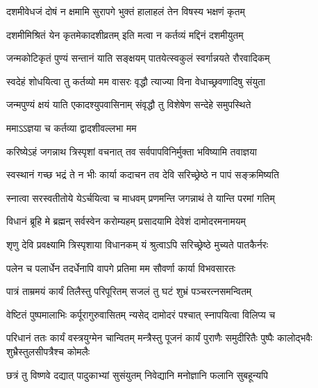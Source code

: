\twolineshloka
{दशमीवेधजं दोषं न क्षमामि सुरापगे}
{भुक्तं हालाहलं तेन विषस्य भक्षणं कृतम्}%

\twolineshloka
{दशमीमिश्रितं येन कृतमेकादशीव्रतम्}
{इति मत्वा न कर्तव्यं मद्दिनं दशमीयुतम्}%

\twolineshloka
{जन्मकोटिकृतं पुण्यं सन्तानं याति सङ्क्षयम्}
{पातयेत्स्वकुलं स्वर्गान्नयते रौरवादिकम्}%

\twolineshloka
{स्वदेहं शोधयित्वा तु कर्तव्यो मम वासरः}
{वृद्धौ त्याज्या विना वेधाच्छ्रवणादिषु संयुता}%

\twolineshloka
{जन्मपुण्यं क्षयं याति एकादश्युपवासिनाम्}
{संवृद्धौ तु विशेषेण सन्देहे समुपस्थिते}%

\onelineshloka
{ममाऽऽज्ञया च कर्तव्या द्वादशीवल्लभा मम}%


\twolineshloka
{करिष्येऽहं जगन्नाथ त्रिस्पृशां वचनात् तव}
{सर्वपापविनिर्मुक्ता भविष्यामि तवाज्ञया}%


\twolineshloka
{स्वस्थानं गच्छ भद्रं ते न भीः कार्या कदाचन}
{तव देवि सरिच्छ्रेष्ठे न पापं सङ्क्रमिष्यति}%

\twolineshloka
{स्नात्वा सरस्वतीतोये येऽर्चयित्वा च माधवम्}
{प्रणमन्ति जगन्नाथं ते यान्ति परमां गतिम्}%


\twolineshloka
{विधानं ब्रूहि मे ब्रह्मन् सर्वस्वेन करोम्यहम्}
{प्रसादयामि देवेशं दामोदरमनामयम्}%


\twolineshloka
{शृणु देवि प्रवक्ष्यामि त्रिस्पृशाया विधानकम्}
{यं श्रुत्वाऽपि सरिच्छ्रेष्ठे मुच्यते पातकैर्नरः}%

\twolineshloka
{पलेन च पलार्धेन तदर्धेनापि वापगे}
{प्रतिमा मम सौवर्णा कार्या विभवसारतः}%

\twolineshloka
{पात्रं ताम्रमयं कार्यं तिलैस्तु परिपूरितम्}
{सजलं तु घटं शुभ्रं पञ्चरत्नसमन्वितम्}%

\twolineshloka
{वेष्टितं पुष्पमालाभिः कर्पूरागुरुवासितम्}
{न्यसेद् दामोदरं पश्चात् स्नापयित्वा विलिप्य च}%

\threelineshloka
{परिधानं ततः कार्यं वस्त्रयुग्मेन चान्वितम्}
{मन्त्रैस्तु पूजनं कार्यं पुराणैः समुदीरितैः}
{पुष्पैः कालोद्भवैः शुभ्रैस्तुलसीपत्रैश्च कोमलैः}%

\twolineshloka
{छत्रं तु विष्णवे दद्यात् पादुकाभ्यां सुसंयुतम्}
{निवेद्यानि मनोज्ञानि फलानि सुबहून्यपि}%

